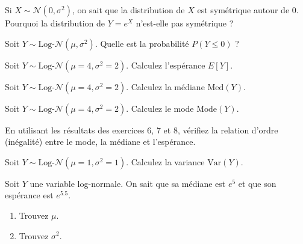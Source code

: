\begin{exercicebox}
Si $X \sim \mathcal{N}(0, \sigma^2)$, on sait que la distribution de $X$ est symétrique autour de 0.
Pourquoi la distribution de $Y = e^X$ n'est-elle pas symétrique ?
\end{exercicebox}

\begin{exercicebox}
Soit $Y \sim \text{Log-}\mathcal{N}(\mu, \sigma^2)$. Quelle est la probabilité $P(Y \le 0)$ ?
\end{exercicebox}


\begin{exercicebox}
Soit $Y \sim \text{Log-}\mathcal{N}(\mu=4, \sigma^2=2)$.
Calculez l'espérance $E[Y]$.
\end{exercicebox}

\begin{exercicebox}
Soit $Y \sim \text{Log-}\mathcal{N}(\mu=4, \sigma^2=2)$.
Calculez la médiane $\text{Med}(Y)$.
\end{exercicebox}

\begin{exercicebox}
Soit $Y \sim \text{Log-}\mathcal{N}(\mu=4, \sigma^2=2)$.
Calculez le mode $\text{Mode}(Y)$.
\end{exercicebox}

\begin{exercicebox}
En utilisant les résultats des exercices 6, 7 et 8, vérifiez la relation d'ordre (inégalité) entre le mode, la médiane et l'espérance.
\end{exercicebox}

\begin{exercicebox}
Soit $Y \sim \text{Log-}\mathcal{N}(\mu=1, \sigma^2=1)$.
Calculez la variance $\text{Var}(Y)$.
\end{exercicebox}

\begin{exercicebox}
Soit $Y$ une variable log-normale. On sait que sa médiane est $e^5$ et que son espérance est $e^{5.5}$.
\begin{enumerate}
    \item Trouvez $\mu$.
    \item Trouvez $\sigma^2$.
\end{enumerate}
\end{exercicebox}

